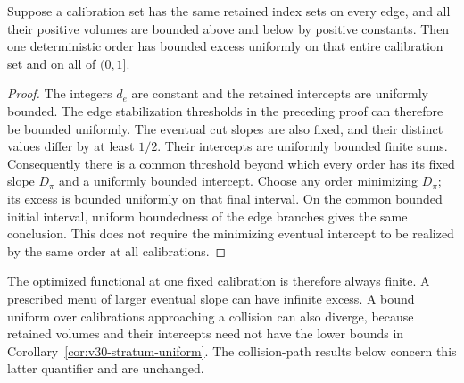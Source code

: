 \begin{corollary}
\label{cor:v30-stratum-uniform}
Suppose a calibration set has the same retained index sets on every
edge, and all their positive volumes are bounded above and below by
positive constants. Then one deterministic order has bounded excess
uniformly on that entire calibration set and on all of $(0,1]$.
\end{corollary}
\begin{proof}
The integers $d_e$ are constant and the retained intercepts are
uniformly bounded. The edge stabilization thresholds in the preceding
proof can therefore be bounded uniformly. The eventual cut slopes are
also fixed, and their distinct values differ by at least $1/2$.
Their intercepts are uniformly bounded finite sums. Consequently
there is a common threshold beyond which every order has its fixed
slope $D_\pi$ and a uniformly bounded intercept. Choose any order
minimizing $D_\pi$; its excess is bounded uniformly on that final
interval. On the common bounded initial interval, uniform boundedness
of the edge branches gives the same conclusion. This does not require
the minimizing eventual intercept to be realized by the same order
at all calibrations.
\end{proof}

The optimized functional at one fixed calibration is therefore always
finite. A prescribed menu of larger eventual slope can have infinite
excess. A bound uniform over calibrations approaching a collision can
also diverge, because retained volumes and their intercepts need not
have the lower bounds in Corollary~\ref{cor:v30-stratum-uniform}.
The collision-path results below concern this latter quantifier and
are unchanged.
